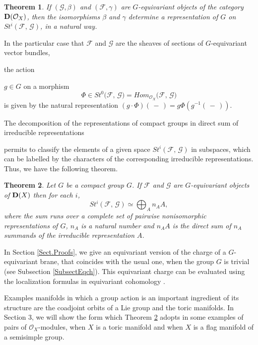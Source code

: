 \documentclass[xypic,amscd,syntonly,amssymb,verbatim,12pt]{amsart}
\theoremstyle{plain}
\newtheorem{Thm}{Theorem}
\theoremstyle{definition}
\theoremstyle{remark}
\numberwithin{equation}{section}
\begin{document}
\begin{Thm}\label{ThmrepresentaObj}
 If $({\mathcal G},\beta)$ and $({\mathcal F},\gamma)$ are $G$-equivariant  objects of the category ${\bf
 D}({\mathcal O}_X)$, then the isomorphisms $\beta $ and $\gamma$ determine a
 representation of $G$ on $St^i({\mathcal F},\,{\mathcal G})$, in a natural way.
 \end{Thm}



In the particular case that ${\mathcal F}$ and  ${\mathcal G}$ are
the sheaves of sections of $G$-equivariant vector bundles,
 
  the action
  
   $g\in G$ on a morphism
 $$\Phi\in St^0\big({\mathcal F},\,{\mathcal G}\big)=
 Hom_{{\mathcal O}_X}\big({\mathcal F},\,{\mathcal G}\big)$$
    is given by the natural representation
 $(g\cdot\Phi)(\,-\,)=g\Phi(g^{-1}(\,-\,))$.
 



The decomposition of the representations of compact groups in
direct sum of irreducible representations
 
  permits to classify the elements of a given space
$St^i({\mathcal F},\,{\mathcal G})$ in  subspaces, which
can be labelled by the characters of the corresponding irreducible
representations. Thus, we have the following theorem.

\begin{Thm}\label{Thmcharacters}
Let $G$ be a compact  group $G$. If  ${\mathcal F}$ and ${\mathcal
G}$ are $G$-equivariant objects of ${\bf D}(X)$
then for each $i$,
\begin{equation}\label{Sti}
St^i({\mathcal F},\,{\mathcal G})\simeq \bigoplus_{A}n_{A}
A,
 \end{equation}
 where
the sum runs over a  complete set of pairwise nonisomorphic representations  of $G$, $n_{A}$ is a natural number
 and $n_{A}A$ is the direct sum of $n_{A}$   summands of the
irreducible representation $A$.
\end{Thm}

In Section \ref{Sect.Proofs}, we give   an equivariant version of the charge
 of a $G$-equivariant brane, that coincides with the usual one,
 when the group $G$ is trivial (see Subsection \ref{SubsectEqch}). This equivariant charge can be
 evaluated using the localization formulas in equivariant
 cohomology \cite{B-G-V}.


Examples manifolds in which a group action is an important
ingredient of its structure are the coadjoint orbits of a Lie
group and the toric manifolds. In Section 3, we will show the form
which  Theorem \ref{Thmcharacters} adopts in some examples of
pairs of ${\mathcal O}_X$-modules, when $X$ is a toric manifold
and when $X$ is a flag manifold of a semisimple group.
\end{document}
